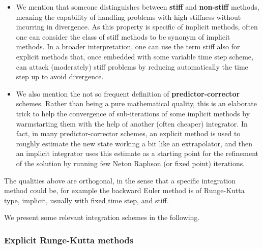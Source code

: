 \documentclass{digitaldynamics}
\begin{document}
\begin{itemize}
\item
We mention that someone distinguishes between \textbf{stiff} and \textbf{non-stiff} methods, meaning the capability of handling problems with high stiffness without incurring in divergence. As this property is specific of implicit methods, often one can consider the class of stiff methods to be synonym of implicit methods. In a broader interpretation, one can use the term stiff also for explicit methods that, once embedded with some variable time step scheme, can attack (moderately) stiff problems by reducing automatically the time step up to avoid divergence.

\item
We also mention the not so frequent definition of \textbf{predictor-corrector} schemes. Rather than being a pure mathematical quality, this is an elaborate trick to help the convergence of sub-iterations of some implicit methods by warmstarting them with the help of another (often cheaper) integrator. In fact, in many predictor-corrector schemes, an explicit method is used to roughly estimate the new state working a bit like an extrapolator, and then an implicit integrator uses this estimate as a starting point for the refinement of the solution by running few Neton Raphson (or fixed point) iterations.

\end{itemize}

The qualities above are orthogonal, in the sense that a specific integration method could be, for example the backward Euler method is of Runge-Kutta type, implicit, usually with fixed time step, and stiff.

We present some relevant integration schemes in the following.


\subsubsection{Explicit Runge-Kutta methods}
\end{document}
